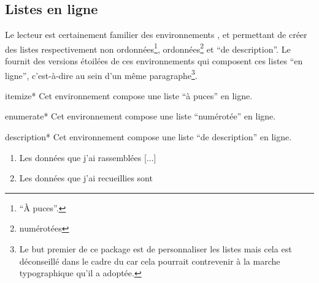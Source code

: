 \documentclass[french,nolocaltoc]{nwejmart}
\newtheorem[title=Fait,style=definition]{fact}
\begin{document}
\subsection{Listes en ligne}
\label{sec:listes-en-ligne}

Le lecteur est certainement familier des environnements
,  et
 permettant de créer des listes respectivement
non ordonnées\footnote{\enquote{À puces}.}, ordonnées\footnote{\Ie*{}
  numérotées} et \enquote{de description}. Le  fournit des
versions étoilées de ces environnements qui composent ces listes \enquote{en
  ligne}, c'est-à-dire au sein d'un même paragraphe\footnote{Le but premier de
  ce package est de personnaliser les listes mais cela est déconseillé dans le
  cadre du \nwejm{} car cela pourrait contrevenir à la marche typographique
  qu'il a adoptée.}.

\begin{docEnvironment}[doclang/environment content=liste]{itemize*}{}
  Cet environnement compose une liste \enquote{à puces} en ligne.
\end{docEnvironment}
\begin{docEnvironment}[doclang/environment content=liste]{enumerate*}{}
  Cet environnement compose une liste \enquote{numérotée} en ligne.
\end{docEnvironment}
\begin{docEnvironment}[doclang/environment content=liste]{description*}{}
  Cet environnement compose une liste \enquote{de description} en ligne.
\end{docEnvironment}

\begin{bodycode}[listing and text,listing options={deletekeywords={url,math,url,pages}}]
\begin{enumerate}
\item Les données que j’ai rassemblées [...]
\item Les données que j’ai recueillies sont
\end{enumerate}
\end{bodycode}
\end{document}
